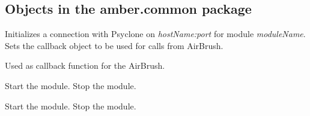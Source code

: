 \subsection{Objects in the amber.common package}


\begin{classmetadata}
\end{classmetadata}

\begin{interface}
    {Initializes a connection with Psyclone on \emph{hostName:port} for module
      \emph{moduleName}.}
    {Sets the callback object to be used for calls from AirBrush.}
\end{interface}




\begin{interface}
    {Used as callback function for the AirBrush.}
\end{interface}







\begin{classmetadata}
\end{classmetadata}

\begin{interface}
    {Start the module.}
    {Stop the module.}
\end{interface}




\begin{classmetadata}
\end{classmetadata}

\begin{interface}
    {Start the module.}
    {Stop the module.}
\end{interface}






